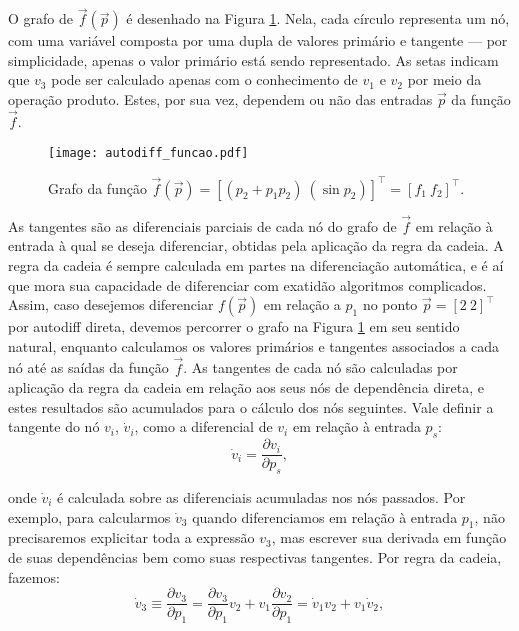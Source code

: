       \noindent O grafo de $\vec{f}(\vec{p})$ é desenhado na Figura \ref{f:autodiff_funcao}. Nela, cada círculo representa um nó, com uma variável composta por uma dupla de valores primário e tangente --- por simplicidade, apenas o valor primário está sendo representado. As setas indicam que $v_3$ pode ser calculado apenas com o conhecimento de $v_1$ e $v_2$ por meio da operação produto. Estes, por sua vez, dependem ou não das entradas $\vec{p}$ da função $\vec{f}$.

      \begin{figure}
        \begin{center}
          \texttt{[image: autodiff\_funcao.pdf]}
        \end{center}
        \caption{Grafo da função $\vec{f}(\vec{p}) = \left[(p_2 + p_1 p_2)\ (\sin{p_2})\right]^\top = \left[f_1\ f_2\right]^\top$.}
        \label{f:autodiff_funcao}
      \end{figure}

      As tangentes são as diferenciais parciais de cada nó do grafo de $\vec{f}$ em relação à entrada à qual se deseja diferenciar, obtidas pela aplicação da regra da cadeia. A regra da cadeia é sempre calculada em partes na diferenciação automática, e é aí que mora sua capacidade de diferenciar com exatidão algoritmos complicados. Assim, caso desejemos diferenciar $f(\vec{p})$ em relação a $p_1$ no ponto $\vec{p} = [2\ 2]^\top$ por autodiff direta, devemos percorrer o grafo na Figura \ref{f:autodiff_funcao} em seu sentido natural, enquanto calculamos os valores primários e tangentes associados a cada nó até as saídas da função $\vec{f}$. As tangentes de cada nó são calculadas por aplicação da regra da cadeia em relação aos seus nós de dependência direta, e estes resultados são acumulados para o cálculo dos nós seguintes. Vale definir a tangente do nó $v_i$, $\dot{v}_i$, como a diferencial de $v_i$ em relação à entrada $p_s$:
      \begin{equation} \label{e:autodiff_direta_tangente}
        \dot{v}_i = \frac{\partial v_i}{\partial p_s}
        ,
      \end{equation}

      \noindent onde $\dot{v}_i$ é calculada sobre as diferenciais acumuladas nos nós passados. Por exemplo, para calcularmos $\dot{v}_3$ quando diferenciamos em relação à entrada $p_1$, não precisaremos explicitar toda a expressão $v_3$, mas escrever sua derivada em função de suas dependências bem como suas respectivas tangentes. Por regra da cadeia, fazemos:
      \begin{equation} \label{e:autodiff_direta_tangente_exemplo}
        \dot{v}_3 \equiv
        \frac{\partial v_3}{\partial p_1} =
        \frac{\partial v_3}{\partial p_1} v_2
          + v_1 \frac{\partial v_2}{\partial p_1} =
        \dot{v}_1 v_2 + v_1 \dot{v}_2
        ,
      \end{equation}

